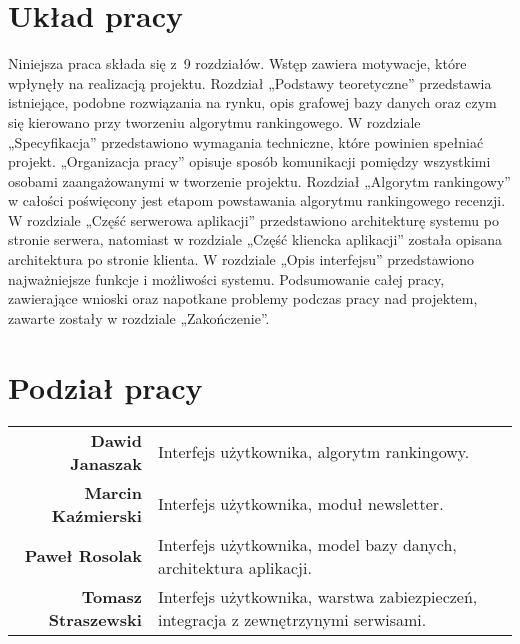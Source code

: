 \section{Układ pracy}
Niniejsza praca składa się z~9 rozdziałów. Wstęp zawiera motywacje, które wpłynęły na realizacją projektu. Rozdział „Podstawy teoretyczne” przedstawia istniejące, podobne rozwiązania na rynku, opis grafowej bazy danych oraz czym się kierowano przy tworzeniu algorytmu rankingowego. W rozdziale „Specyfikacja” przedstawiono wymagania techniczne, które powinien spełniać projekt. „Organizacja pracy” opisuje sposób komunikacji pomiędzy wszystkimi osobami zaangażowanymi w tworzenie projektu.  Rozdział „Algorytm rankingowy” w całości poświęcony jest etapom powstawania algorytmu rankingowego recenzji. W rozdziale „Część serwerowa aplikacji” przedstawiono architekturę systemu po stronie serwera, natomiast w rozdziale „Część kliencka aplikacji” została opisana architektura po stronie klienta. W rozdziale „Opis interfejsu” przedstawiono najważniejsze funkcje i możliwości systemu. Podsumowanie całej pracy, zawierające wnioski oraz napotkane problemy podczas pracy nad projektem, zawarte zostały w rozdziale „Zakończenie”.


\section{Podział pracy}
\noindent\begin{tabular}{rp{9cm}}
\textbf{Dawid Janaszak} & Interfejs użytkownika, algorytm rankingowy.\\

\textbf{Marcin Kaźmierski} & Interfejs użytkownika, moduł newsletter.\\

\textbf{Paweł Rosolak} & Interfejs użytkownika, model bazy danych, architektura aplikacji.\\

\textbf{Tomasz Straszewski} & Interfejs użytkownika, warstwa zabiezpieczeń, integracja z zewnętrzynymi serwisami.\\
\end{tabular}

